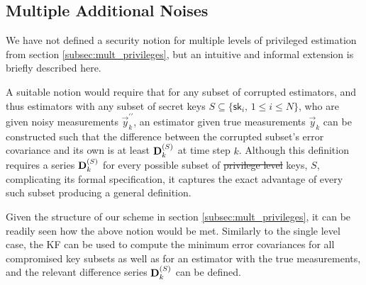 \documentclass[letterpaper, 10 pt, conference]{ieeeconf}
\providecommand{\DIFdel}[1]{{\protect\color{red}\sout{#1}}}                      %
\providecommand{\DIFaddbegin}{} %
\providecommand{\DIFaddend}{} %
\providecommand{\DIFdelbegin}{} %
\providecommand{\DIFdelend}{} %
\newcommand{\DIFscaledelfig}{0.5}
\newlength{\DIFdelgraphicswidth} %
\newlength{\DIFdelgraphicsheight} %
\newcommand{\DIFaddincludegraphics}[2][]{{\color{blue}\fbox{\DIFOincludegraphics[#1]{#2}}}} %
\newcommand{\DIFdelincludegraphics}[2][]{%
\sbox{\DIFdelgraphicsbox}{\DIFOincludegraphics[#1]{#2}}%
\settoboxwidth{\DIFdelgraphicswidth}{\DIFdelgraphicsbox} %
\settoboxtotalheight{\DIFdelgraphicsheight}{\DIFdelgraphicsbox} %
\scalebox{\DIFscaledelfig}{%
\parbox[b]{\DIFdelgraphicswidth}{\usebox{\DIFdelgraphicsbox}\\[-\baselineskip] \rule{\DIFdelgraphicswidth}{0em}}\llap{\resizebox{\DIFdelgraphicswidth}{\DIFdelgraphicsheight}{%
\setlength{\unitlength}{\DIFdelgraphicswidth}%
\begin{picture}(1,1)%
\thicklines\linethickness{2pt} %
{\color[rgb]{1,0,0}\put(0,0){\framebox(1,1){}}}%
{\color[rgb]{1,0,0}\put(0,0){\line( 1,1){1}}}%
{\color[rgb]{1,0,0}\put(0,1){\line(1,-1){1}}}%
\end{picture}%
}\hspace*{3pt}}} %
} %
\DeclareRobustCommand{\DIFaddbegin}{\DIFOaddbegin \let\includegraphics\DIFaddincludegraphics} %
\DeclareRobustCommand{\DIFaddend}{\DIFOaddend \let\includegraphics\DIFOincludegraphics} %
\DeclareRobustCommand{\DIFdelbegin}{\DIFOdelbegin \let\includegraphics\DIFdelincludegraphics} %
\DeclareRobustCommand{\DIFdelend}{\DIFOaddend \let\includegraphics\DIFOincludegraphics} %
\begin{document}
% 
% 

\subsection{Multiple Additional Noises}
We have not defined a security notion for multiple levels of privileged estimation from section \ref{subsec:mult_privileges}, but an intuitive and informal extension is briefly described here. 

A suitable notion would require that for any subset of corrupted estimators, and thus estimators with any subset of secret keys $S \subseteq \{\mathsf{sk}_i,\,1\leq i\leq N\}$, who are given noisy measurements $\vec{y}_k^{\prime\prime}$, an estimator given true measurements $\vec{y}_k$ can be constructed such that the difference between the corrupted subset's error covariance and its own is at least ${{\mathbf{D}}}^{(S)}_k$ at time step $k$. Although this definition requires a series ${{\mathbf{D}}}^{(S)}_k$ for every possible subset of \DIFdelbegin \DIFdel{privilege level }\DIFdelend keys, $S$, complicating its formal specification, it captures the exact advantage of every such subset producing a general definition.

Given the structure of our scheme in section \ref{subsec:mult_privileges}, it can be readily seen how the above notion would be met. Similarly to the single level case, the KF can be used to compute the minimum error covariances for all compromised key subsets as well as for an estimator with the true measurements, and the relevant difference series ${{\mathbf{D}}}^{(S)}_k$ can be defined. 

% 
%                                                     
% 

\DIFdelbegin %
\DIFdelend \DIFaddbegin \addtolength{\textheight}{-0.074cm}
\DIFaddend 
\end{document}
